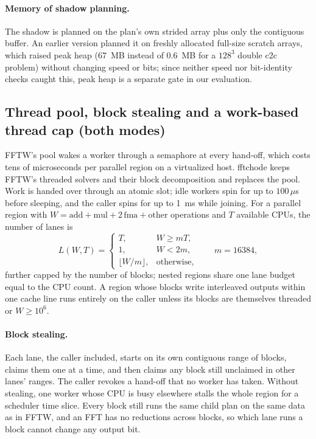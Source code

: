 \documentclass[10pt]{article}
\theoremstyle{definition}
\begin{document}
\paragraph{Memory of shadow planning.} The shadow is planned on the plan's own strided array plus only the contiguous buffer. An earlier version planned it on freshly allocated full-size scratch arrays, which raised peak heap (67~MB instead of 0.6~MB for a $128^3$ double c2c problem) without changing speed or bits; since neither speed nor bit-identity checks caught this, peak heap is a separate gate in our evaluation.

\subsection{Thread pool, block stealing and a work-based thread cap (both modes)}\label{sec:threads}

FFTW's pool wakes a worker through a semaphore at every hand-off, which costs tens of microseconds per parallel region on a virtualized host. fftchode keeps FFTW's threaded solvers and their block decomposition and replaces the pool. Work is handed over through an atomic slot; idle workers spin for up to $100\,\mu$s before sleeping, and the caller spins for up to 1~ms while joining. For a parallel region with $W=\mathrm{add}+\mathrm{mul}+2\,\mathrm{fma}+\mathrm{other}$ operations and $T$ available CPUs, the number of lanes is
\begin{equation}\label{eq:lanes}
L(W,T)=\begin{cases}T, & W\ge mT,\\ 1, & W<2m,\\ \lfloor W/m\rfloor, & \text{otherwise},\end{cases}\qquad m=16384,
\end{equation}
further capped by the number of blocks; nested regions share one lane budget equal to the CPU count. A region whose blocks write interleaved outputs within one cache line runs entirely on the caller unless its blocks are themselves threaded or $W\ge10^6$.

\paragraph{Block stealing.} Each lane, the caller included, starts on its own contiguous range of blocks, claims them one at a time, and then claims any block still unclaimed in other lanes' ranges. The caller revokes a hand-off that no worker has taken. Without stealing, one worker whose CPU is busy elsewhere stalls the whole region for a scheduler time slice. Every block still runs the same child plan on the same data as in FFTW, and an FFT has no reductions across blocks, so which lane runs a block cannot change any output bit.
\end{document}
